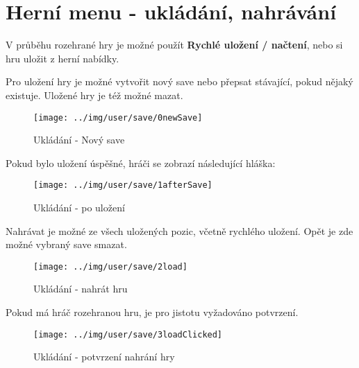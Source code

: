
\section{Herní menu - ukládání, nahrávání}

V průběhu rozehrané hry je možné použít \textbf{Rychlé uložení / načtení}, nebo si hru uložit z herní nabídky.

Pro uložení hry je možné vytvořit nový save nebo přepsat stávající, pokud nějaký existuje. Uložené hry je též možné mazat.

\begin{figure}[!ht]\centering
\texttt{[image: ../img/user/save/0newSave]}

\caption{Ukládání - Nový save}
\label{fig:user_save_0newSave}

\end{figure}
\FloatBarrier

Pokud bylo uložení úspěšné, hráči se zobrazí následující hláška:

\begin{figure}[!ht]\centering
\texttt{[image: ../img/user/save/1afterSave]}

\caption{Ukládání - po uložení}
\label{fig:user_save_1afterSave}

\end{figure}
\FloatBarrier

Nahrávat je možné ze všech uložených pozic, včetně rychlého uložení. Opět je zde možné vybraný save smazat.

\begin{figure}[!ht]\centering
\texttt{[image: ../img/user/save/2load]}

\caption{Ukládání - nahrát hru}
\label{fig:user_save_2load}

\end{figure}
\FloatBarrier

Pokud má hráč rozehranou hru, je pro jistotu vyžadováno potvrzení.

\begin{figure}[!ht]\centering
\texttt{[image: ../img/user/save/3loadClicked]}

\caption{Ukládání - potvrzení nahrání hry}
\label{fig:user_save_3loadClicked}

\end{figure}

\FloatBarrier